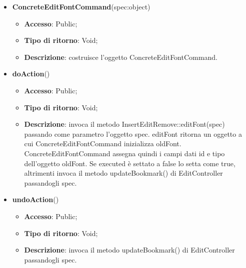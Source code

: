 {{{\begin{itemize}
\begin{itemize}
\begin{itemize}
\begin{itemize}
				\end{itemize}
			\end{itemize}
				\end{itemize}
				\end{itemize}
			\begin{itemize}
				\item \textbf{ConcreteEditFontCommand}(spec:object)
				\begin{itemize}
					\item \textbf{Accesso}: Public;
					\item \textbf{Tipo di ritorno}: Void;
					\item \textbf{Descrizione}: costruisce l’oggetto ConcreteEditFontCommand.
				\end{itemize}
				\item \textbf{doAction}()
				\begin{itemize}
					\item \textbf{Accesso}: Public;
					\item \textbf{Tipo di ritorno}: Void;
					\item \textbf{Descrizione}: invoca il metodo InsertEditRemove::editFont(spec) passando come parametro l'oggetto spec. editFont ritorna un oggetto a cui ConcreteEditFontCommand inizializza oldFont. ConcreteEditFontCommand assegna quindi i campi dati id e tipo dell'oggetto oldFont. Se executed è settato a false lo setta come true, altrimenti invoca il metodo updateBookmark() di EditController passandogli spec.
				\end{itemize}
				\item \textbf{undoAction}()
				\begin{itemize}
					\item \textbf{Accesso}: Public;
					\item \textbf{Tipo di ritorno}: Void;
					\item \textbf{Descrizione}: invoca il metodo updateBookmark() di EditController passandogli spec.
				\end{itemize}
			\end{itemize}
	}

}}
